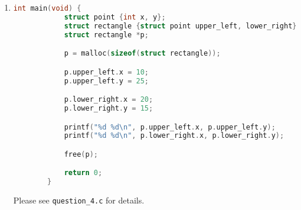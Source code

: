 \documentclass[12pt]{article}
\begin{document}
\begin{enumerate}[1.]
    \item


    \begin{lstlisting}[language=c]
        int main(void) {
            struct point {int x, y};
            struct rectangle {struct point upper_left, lower_right};
            struct rectangle *p;

            p = malloc(sizeof(struct rectangle));

            p.upper_left.x = 10;
            p.upper_left.y = 25;

            p.lower_right.x = 20;
            p.lower_right.y = 15;

            printf("%d %d\n", p.upper_left.x, p.upper_left.y);
            printf("%d %d\n", p.lower_right.x, p.lower_right.y);

            free(p);

            return 0;
        }

    \end{lstlisting}


    Please see \texttt{question\_4.c} for details.

\end{enumerate}
\end{document}
